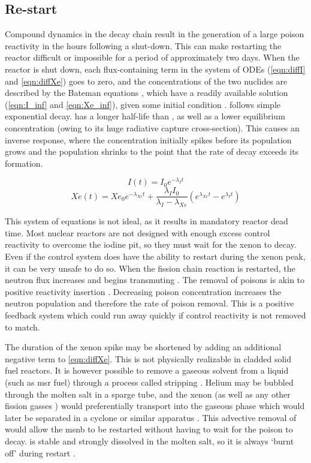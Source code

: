 \subsection{Re-start}
Compound dynamics in the \Xe decay chain result in the generation of a large poison reactivity in the hours following a shut-down. This can make restarting the reactor difficult or impossible for a period of approximately two days. When the reactor is shut down, each flux-containing term in the system of ODEs (\ref{eqn:diffI} and \ref{eqn:diffXe}) goes to zero, and the concentrations of the two nuclides are described by the Bateman equations \cite{Bateman}, which have a readily available solution (\ref{eqn:I_inf} and \ref{eqn:Xe_inf}), given some initial condition \cite{Lamarsh}. \I follows simple exponential decay. \Xe has a longer half-life than \I, as well as a lower equilibrium concentration (owing to its huge radiative capture cross-section). This causes an inverse response, where the \Xe concentration initially spikes before its population grows and the \I population shrinks to the point that the rate of \Xe decay exceeds its formation. 

\begin{equation}\label{eqn:I_inf}
    I(t) = I_0e^{-\lambda_I t}
\end{equation}
\begin{equation}\label{eqn:Xe_inf}
    Xe(t) = Xe_0e^{-\lambda_{Xe} t}+\frac{\lambda_I I_0}{\lambda_I - \lambda_{Xe}}(e^{\lambda_{Xe}t}-e^{\lambda_{I}t})
\end{equation}

This system of equations is not ideal, as it results in mandatory reactor dead time. Most nuclear reactors are not designed with enough excess control reactivity to overcome the iodine pit, so they must wait for the xenon to decay. Even if the control system does have the ability to restart during the xenon peak, it can be very unsafe to do so. When the fission chain reaction is restarted, the neutron flux increases and begins transmuting \Xe. The removal of poisons is akin to positive reactivity insertion \cite{Roberson}. Decreasing poison concentration increases the neutron population and therefore the rate of poison removal. This is a positive feedback system which could run away quickly if control reactivity is not removed to match. 

The duration of the xenon spike may be shortened by adding an additional negative term to \ref{eqn:diffXe}. This is not physically realizable in cladded solid fuel reactors. It is however possible to remove a gaseous solvent from a liquid (such as \acs{msr} fuel) through a process called stripping \cite[Ch. 10]{Geankoplis}. Helium may be bubbled through the molten salt in a sparge tube, and the xenon (as well as any other fission gasses \cite{Offgas}) would preferentially transport into the gaseous phase which would later be separated in a cyclone or similar apparatus \cite{ORNL-masstransport}. This advective removal of \Xe would allow the \acs{msnb} to be restarted without having to wait for the poison to decay. \Sa is stable and strongly dissolved in the molten salt, so it is always `burnt off' during restart \cite[Ch. 7]{Lamarsh}.